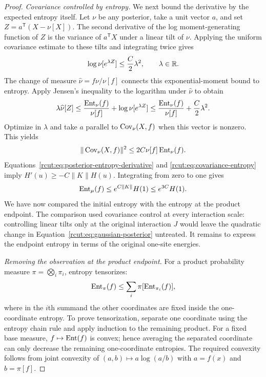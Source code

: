 \begin{proof}
\medskip
\noindent\emph{Covariance controlled by entropy.}
We next bound the derivative by the expected entropy itself.
Let $\nu$ be any posterior, take a unit vector $a$, and set
$Z=a^{\mathsf T}(X-\nu[X])$.  The second derivative of the log
moment-generating function of $Z$ is the variance of $a^{\mathsf T}X$
under a linear tilt of $\nu$.  Applying the uniform covariance estimate
to these tilts and integrating twice gives
\[
 \log\nu[e^{\lambda Z}]\le\frac C2\lambda^2,
 \qquad \lambda\in\mathbb R.
\]
The change of measure $\widehat\nu=f\nu/\nu[f]$ connects this
exponential-moment bound to entropy.  Apply Jensen's inequality to the
logarithm under $\widehat\nu$ to obtain
\[
 \lambda\widehat\nu[Z]
 \le\frac{\operatorname{Ent}_\nu(f)}{\nu[f]}+
       \log\nu[e^{\lambda Z}]
 \le\frac{\operatorname{Ent}_\nu(f)}{\nu[f]}+\frac C2\lambda^2.
\]
Optimize in $\lambda$ and take $a$ parallel to $\operatorname{Cov}_\nu(X,f)$ when
this vector is nonzero.  This yields
\begin{equation}
 \|\operatorname{Cov}_\nu(X,f)\|^2\le2C\nu[f]\operatorname{Ent}_\nu(f).
 \label{rcut:eq:covariance-entropy}
\end{equation}
Equations~\eqref{rcut:eq:posterior-entropy-derivative} and
\eqref{rcut:eq:covariance-entropy} imply $H'(u)\ge-C\|K\|H(u)$.
Integrating from zero to one gives
\begin{equation}
 \operatorname{Ent}_\mu(f)\le e^{C\|K\|}H(1)\le e^{3C}H(1).
 \label{rcut:eq:posterior-entropy-comparison}
\end{equation}
We have now compared the initial entropy with the entropy at the product
endpoint.  The comparison used covariance control at every interaction
scale: controlling linear tilts only at the original interaction $J$
would leave the quadratic change in
Equation~\eqref{rcut:eq:gaussian-posterior} untreated.  It remains to
express the endpoint entropy in terms of the original one-site energies.

\medskip
\noindent\emph{Removing the observation at the product endpoint.}
For a product probability measure $\pi=\bigotimes_i\pi_i$, entropy
tensorizes:
\[
 \operatorname{Ent}_\pi(f)\le\sum_i\pi[\operatorname{Ent}_{\pi_i}(f)],
\]
where in the $i$th summand the other coordinates are fixed inside the
one-coordinate entropy.  To prove tensorization, separate one coordinate
using the entropy chain rule and apply induction to the remaining
product.  For a fixed base measure, $f\mapsto\operatorname{Ent}(f)$ is convex; hence
averaging the separated coordinate can only decrease the remaining
one-coordinate entropies.  The required convexity follows from joint
convexity of $(a,b)\mapsto a\log(a/b)$ with $a=f(x)$ and $b=\pi[f]$.


\end{proof}
